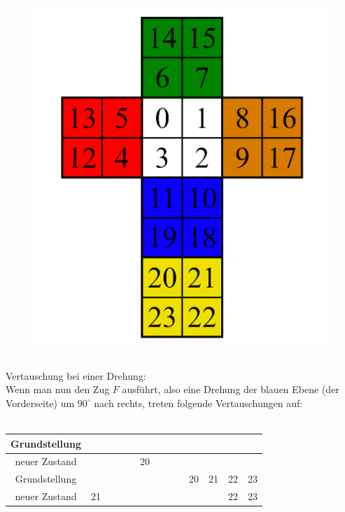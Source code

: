 \documentclass[12pt,a4paper, usenames, dvipsnames]{scrartcl}
\begin{document}
\\
\begin{figure}[h]
\centering
\includegraphics[scale=0.18]{2x2foldedout.png}
\end{figure}
\\
Vertauschung bei einer Drehung: \\
Wenn man nun den Zug $F$ ausführt, also eine Drehung der blauen Ebene (der Vorderseite) um $90^\circ$ nach rechts, treten folgende Vertauschungen auf: \\ \\
\begin{tabular}{|c|c|c|c|c|c|c|c|c|c|c|c|c|}
\hline
Grundstellung & \color{gray}{0} & \color{gray}{1} & \color{gray}{2} & \color{gray}{3} & \color{red}{4} & \color{red}{5} & \color{ForestGreen}{6} & \color{ForestGreen}{7} & \color{orange}{8} & \color{orange}{9} & \color{blue}{10} & \color{blue}{11} \\
\hline
neuer Zustand & \color{gray}{0} & \color{gray}{1} & \color{red}{4} & \color{red}{12} & 20 & \color{red}{5} & \color{ForestGreen}{6} & \color{ForestGreen}{7} & \color{orange}{8} & \color{gray}{3} & \color{blue}{11} & \color{blue}{19} \\
\hline
\hline
Grundstellung & \color{red}{12} & \color{red}{13} & \color{ForestGreen}{14} & \color{ForestGreen}{15} & \color{orange}{16} & \color{orange}{17} & \color{blue}{18} & \color{blue}{19} & 20 & 21 & 22 & 23 \\
\hline
neuer Zustand & 21 & \color{red}{13} & \color{ForestGreen}{14} & \color{ForestGreen}{15} & \color{orange}{16} & \color{gray}{2} & \color{blue}{10} & \color{blue}{19} & \color{orange}{9} & \color{orange}{17} & 22 & 23\\
\hline
\end{tabular} \\
\end{document}
